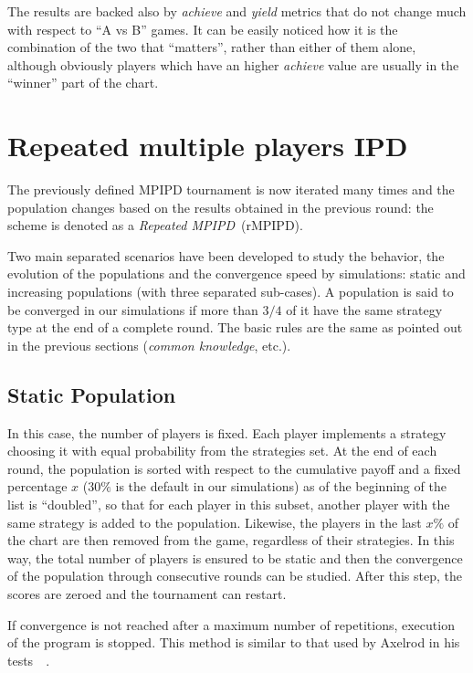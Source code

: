 \documentclass[journal,10pt,twoside]{IEEEtran}
\begin{document}
The results are backed also by \textit{achieve} and \textit{yield} metrics that do not change much with respect to ``A vs B'' games.
It can be easily noticed how it is the combination of the two that ``matters'', rather than either of them alone, although obviously players which have an higher \textit{achieve} value are usually in the ``winner'' part of the chart.

\section{Repeated multiple players IPD} \label{s:rIPDMP}
The previously defined MPIPD tournament is now iterated many times and the population changes based on the results obtained in the previous round: the scheme is denoted as a \textit{Repeated MPIPD}~(rMPIPD).

Two main separated scenarios have been developed to study the behavior, the evolution of the populations and the convergence speed by simulations: static and increasing populations (with three separated sub-cases). A population is said to be converged in our simulations if more than $3/4$ of it have the same strategy type at the end of a complete round. The basic rules are the same as pointed out in the previous sections (\textit{common knowledge},  etc.).

\subsection{Static Population} \label{ss:rIPDMPc}
In this case, the number of players is fixed. Each player implements a strategy choosing it with equal probability from the strategies set. At the end of each round, the population is sorted with respect to the cumulative payoff and a fixed percentage $x$ ($30\%$ is the default in our simulations) as of the beginning of the list is ``doubled'', so that for each player in this subset, another player with the same strategy is added to the population. Likewise, the players in the last $x\%$ of the chart are then removed from the game, regardless of their strategies. In this way, the total number of players is ensured to be static and then the convergence of the population through consecutive rounds can be studied. After this step, the scores are zeroed and the tournament can restart.

If convergence is not reached after a maximum number of repetitions, execution of the program is stopped.
This method is similar to that used by Axelrod in his tests~\cite[\S 2.6]{mathieu2017}~\cite{axelrod1984evolution}.
\end{document}
